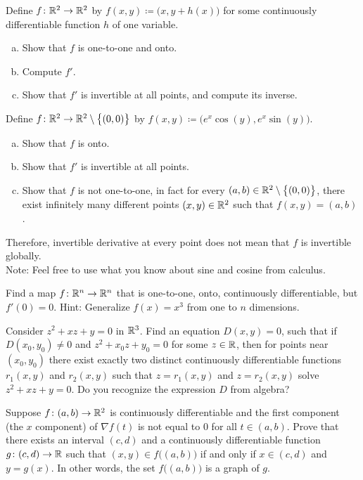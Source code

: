 \begin{exercise}
Define $f \colon {\mathbb{R}}^2 \to {\mathbb{R}}^2$ by $f(x,y) \coloneqq
\bigl(x,y+h(x)\bigr)$ for some continuously differentiable function $h$ of one
variable.
\begin{enumerate}[a)]
\item
Show that $f$ is one-to-one and onto.
\item
Compute $f'$.
\item
Show that $f'$ is invertible at all points, and compute
its inverse.
\end{enumerate}
\end{exercise}

\begin{exercise}
Define $f \colon {\mathbb{R}}^2 \to {\mathbb{R}}^2 \setminus \bigl\{ (0,0) \bigr\}$ by
$f(x,y) \coloneqq \bigl(e^x\cos(y),e^x\sin(y)\bigr)$.
\begin{enumerate}[a)]
\item
Show that $f$ is onto.
\item
Show that $f'$ is invertible at all points.
\item
Show that $f$ is not one-to-one, in fact for every $(a,b) \in {\mathbb{R}}^2
\setminus \bigl\{ (0,0) \bigr\}$,
there exist infinitely many different points $(x,y) \in {\mathbb{R}}^2$ such that 
$f(x,y) = (a,b)$.
\end{enumerate}
Therefore, invertible derivative at every point does not mean that
$f$ is invertible globally.\\
Note: Feel free to use what you know about sine and cosine from calculus.
\end{exercise}

\begin{exercise}
Find a map $f \colon {\mathbb{R}}^n \to {\mathbb{R}}^n$ that is one-to-one, onto,
continuously differentiable, but $f'(0) = 0$.  Hint: Generalize $f(x) = x^3$ from one
to $n$ dimensions.
\end{exercise}

\begin{exercise}
Consider $z^2 + xz + y =0$ in ${\mathbb{R}}^3$.  Find an equation $D(x,y)=0$, such that
if $D(x_0,y_0) \not= 0$ and $z^2+x_0z+y_0 = 0$ for some $z \in {\mathbb{R}}$,
then for points near $(x_0,y_0)$ there exist
exactly two distinct continuously differentiable functions $r_1(x,y)$
and $r_2(x,y)$ such that $z=r_1(x,y)$ and $z=r_2(x,y)$ solve
$z^2 + xz + y =0$.  Do you recognize the expression $D$ from algebra?
\end{exercise}


\begin{exercise}
Suppose $f \colon (a,b) \to {\mathbb{R}}^2$ is continuously differentiable and
the first component (the $x$ component) of $\nabla f(t)$ is not equal to 0
for all $t \in (a,b)$.
Prove that there exists an interval $(c,d)$ and
a continuously differentiable function $g \colon (c,d) \to {\mathbb{R}}$
such that 
$(x,y) \in f\bigl((a,b)\bigr)$ if and only if $x \in (c,d)$ and $y=g(x)$.
In other words, the set
$f\bigl((a,b)\bigr)$ is a graph of $g$.
\end{exercise}

